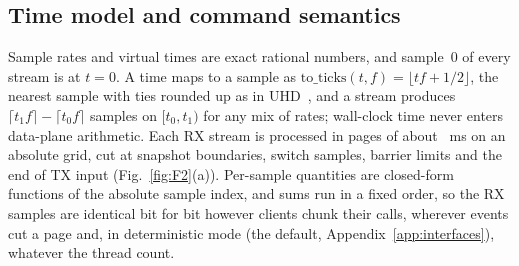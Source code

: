 \subsection{Time model and command semantics}\label{sec:design-time}
Sample rates and virtual times are exact rational numbers, and sample~$0$
of every stream is at $t=0$. A time maps to a sample as $\mathrm{to\_ticks}(t,f)=\lfloor
tf+1/2\rfloor$, the nearest sample with ties rounded up as in UHD~\cite{UHDManual}, and a
stream produces $\lceil t_1f\rceil-\lceil t_0f\rceil$ samples on $[t_0,t_1)$ for any mix of
rates; wall-clock time never enters data-plane arithmetic.
Each RX stream is processed in pages of about \numPageTargetMs~ms on an
absolute grid, cut at snapshot boundaries, switch samples, barrier limits and the end of TX
input (Fig.~\ref{fig:F2}(a)). Per-sample quantities are closed-form functions of the absolute
sample index, and sums run in a fixed order, so the RX samples are identical bit for bit
however clients chunk their calls, wherever events cut a page and, in deterministic mode (the
default, Appendix~\ref{app:interfaces}), whatever the thread count.

\begin{figure}[t]
\centering
{}
\end{figure}

